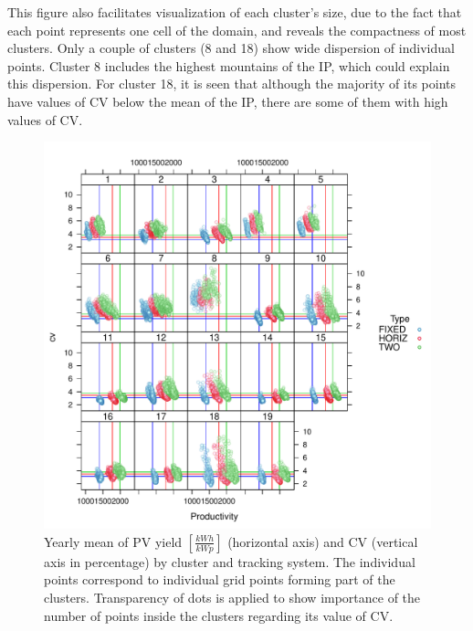 \begin{subappendices}
This figure also facilitates visualization of each cluster's size, due to the fact that each point represents one cell of the domain, and reveals the compactness of most clusters. Only a couple of clusters (8 and 18) show wide dispersion of individual points. Cluster 8 includes the highest mountains of the IP, which could explain this dispersion. For cluster 18, it is seen that although the majority of its points have values of CV below the mean of the IP, there are some of them with high values of CV. 

\begin{figure}[!tbp]
  \includegraphics[width=\textwidth]{figs/capitulo5/Yearlycv_productivity3.pdf}
  \caption[Yearly mean of solar irradiation and variability by tracking type and cluster for each cell over the Iberian Peninsula]{Yearly mean of PV yield $[\frac{kWh}{kWp}]$ (horizontal axis) and CV (vertical axis in percentage) by cluster and tracking system. The individual points correspond to individual grid points forming part of the clusters. Transparency of dots is applied to show importance of the number of points inside the clusters regarding its value of CV.}
  \label{yearly_productivity_and_CV}
\end{figure}




\end{subappendices}
